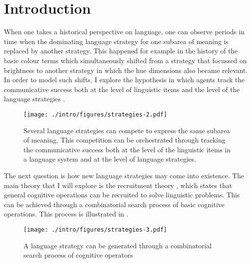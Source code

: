 \section*{Introduction}

\addtocounter{chapter}{1}
\setcounter{figure}{0}

When one takes a historical perspective on language, one can observe
periods in time when the dominating language strategy for one subarea
of meaning is replaced by another strategy. This happened for example
in the history of the basic colour terms which simultaneously shifted
from a strategy that focussed on brightness to another strategy in
which the hue dimensions also became relevant. In order to model such
shifts, I explore the hypothesis in which agents track the
communicative success both at the level of linguistic items and the
level of the language strategies \citep{bleys09linguistic}.

\begin{figure}[htbp]
  \begin{center}
    \texttt{[image: ./intro/figures/strategies-2.pdf]}
    \caption[Several strategies competing to express the same subarea
    of meaning]{Several language strategies can compete to express the
      same subarea of meaning. This competition can be orchestrated
      through tracking the communicative success both at the level of
      the linguistic items in a language system and at the level of
      language strategies.}
    \label{f:strategies-2}
  \end{center}
\end{figure}

The next question is how new language strategies may come into
existence. The main theory that I will explore is the recruitment
theory \citep{steels07recruitment}, which states that general
cognitive operations can be recruited to solve linguistic
problems. This can be achieved through a combinatorial search process
of basic cognitive operations. This process is illustrated in .

\begin{figure}[htbp]
  \begin{center}
    \texttt{[image: ./intro/figures/strategies-3.pdf]}
    \caption[The origins of language strategies]{A language strategy
      can be generated through a combinatorial search process of
      cognitive operators}
    \label{f:strategies-3}
  \end{center}
\end{figure}

\addtocounter{chapter}{-1}

\thispagestyle{empty}